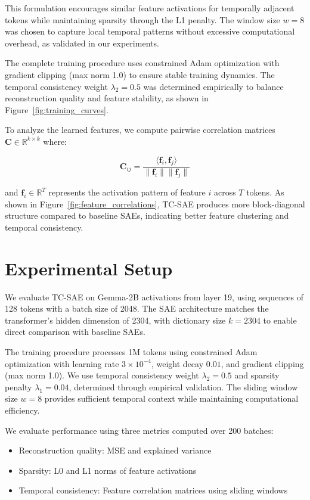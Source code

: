 \documentclass{article} %
\begin{document}
This formulation encourages similar feature activations for temporally adjacent tokens while maintaining sparsity through the L1 penalty. The window size $w=8$ was chosen to capture local temporal patterns without excessive computational overhead, as validated in our experiments.

The complete training procedure uses constrained Adam optimization with gradient clipping (max norm 1.0) to ensure stable training dynamics. The temporal consistency weight $\lambda_2=0.5$ was determined empirically to balance reconstruction quality and feature stability, as shown in Figure~\ref{fig:training_curves}.

To analyze the learned features, we compute pairwise correlation matrices $\mathbf{C}\in\mathbb{R}^{k\times k}$ where:

\begin{equation}
\mathbf{C}_{ij} = \frac{\langle\mathbf{f}_i, \mathbf{f}_j\rangle}{\|\mathbf{f}_i\|\|\mathbf{f}_j\|}
\end{equation}

and $\mathbf{f}_i\in\mathbb{R}^T$ represents the activation pattern of feature $i$ across $T$ tokens. As shown in Figure~\ref{fig:feature_correlations}, TC-SAE produces more block-diagonal structure compared to baseline SAEs, indicating better feature clustering and temporal consistency.

\section{Experimental Setup}
\label{sec:experimental}

We evaluate TC-SAE on Gemma-2B activations from layer 19, using sequences of 128 tokens with a batch size of 2048. The SAE architecture matches the transformer's hidden dimension of 2304, with dictionary size $k=2304$ to enable direct comparison with baseline SAEs.

The training procedure processes 1M tokens using constrained Adam optimization with learning rate $3\times10^{-4}$, weight decay $0.01$, and gradient clipping (max norm 1.0). We use temporal consistency weight $\lambda_2=0.5$ and sparsity penalty $\lambda_1=0.04$, determined through empirical validation. The sliding window size $w=8$ provides sufficient temporal context while maintaining computational efficiency.

We evaluate performance using three metrics computed over 200 batches:
\begin{itemize}
    \item Reconstruction quality: MSE and explained variance
    \item Sparsity: L0 and L1 norms of feature activations
    \item Temporal consistency: Feature correlation matrices using sliding windows
\end{itemize}
\end{document}
